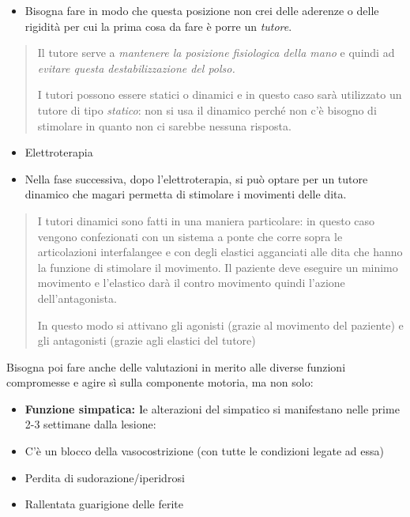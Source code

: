 \documentclass[]{article}
\begin{document}
\begin{itemize}
\item
  Bisogna fare in modo che questa posizione non crei delle aderenze o
  delle rigidità per cui la prima cosa da fare è porre un \emph{tutore}.
\end{itemize}

\begin{quote}
Il tutore serve a \emph{mantenere la posizione fisiologica della mano} e
quindi ad \emph{evitare questa destabilizzazione del polso.}

I tutori possono essere statici o dinamici e in questo caso sarà
utilizzato un tutore di tipo \emph{statico}: non si usa il dinamico
perché non c'è bisogno di stimolare in quanto non ci sarebbe nessuna
risposta.
\end{quote}

\begin{itemize}
\item
  Elettroterapia
\item
  Nella fase successiva, dopo l'elettroterapia, si può optare per un
  tutore dinamico che magari permetta di stimolare i movimenti delle
  dita.
\end{itemize}

\begin{quote}
I tutori dinamici sono fatti in una maniera particolare: in questo caso
vengono confezionati con un sistema a ponte che corre sopra le
articolazioni interfalangee e con degli elastici agganciati alle dita
che hanno la funzione di stimolare il movimento. Il paziente deve
eseguire un minimo movimento e l'elastico darà il contro movimento
quindi l'azione dell'antagonista.

In questo modo si attivano gli agonisti (grazie al movimento del
paziente) e gli antagonisti (grazie agli elastici del tutore)
\end{quote}

Bisogna poi fare anche delle valutazioni in merito alle diverse funzioni
compromesse e agire sì sulla componente motoria, ma non solo:

\begin{itemize}
\item
  \textbf{Funzione simpatica: l}e alterazioni del simpatico si
  manifestano nelle prime 2-3 settimane dalla lesione:
\end{itemize}

\begin{itemize}
\item
  C'è un blocco della vasocostrizione (con tutte le condizioni legate ad
  essa)
\item
  Perdita di sudorazione/iperidrosi
\item
  Rallentata guarigione delle ferite
\end{itemize}
\end{document}
